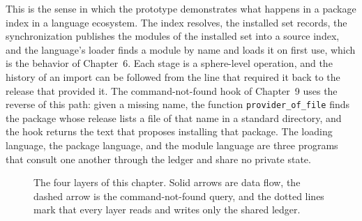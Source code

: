 \documentclass[11pt,oneside]{report}
\theoremstyle{plain}
\theoremstyle{definition}
\theoremstyle{remark}
\newcommand{\code}[2][Python]{}
\begin{document}
\code{ex_index_sync}

This is the sense in which the prototype demonstrates what happens in a package index in a language ecosystem. The index resolves, the installed set records, the synchronization publishes the modules of the installed set into a source index, and the language's loader finds a module by name and loads it on first use, which is the behavior of Chapter~6. Each stage is a sphere-level operation, and the history of an import can be followed from the line that required it back to the release that provided it. The command-not-found hook of Chapter~9 uses the reverse of this path: given a missing name, the function \texttt{provider\_of\_file} finds the package whose release lists a file of that name in a standard directory, and the hook returns the text that proposes installing that package. The loading language, the package language, and the module language are three programs that consult one another through the ledger and share no private state.

\begin{figure}[H]
\centering
{}
\caption{The four layers of this chapter. Solid arrows are data flow, the dashed arrow is the command-not-found query, and the dotted lines mark that every layer reads and writes only the shared ledger.}
\end{figure}
\end{document}
